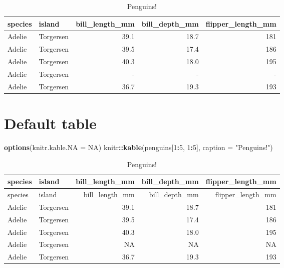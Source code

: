 \documentclass[
]{article}
\newenvironment{Shaded}{\begin{snugshade}}{\end{snugshade}}
\newcommand{\AttributeTok}[1]{\textcolor[rgb]{0.13,0.29,0.53}{#1}}
\newcommand{\ConstantTok}[1]{\textcolor[rgb]{0.56,0.35,0.01}{#1}}
\newcommand{\DecValTok}[1]{\textcolor[rgb]{0.00,0.00,0.81}{#1}}
\newcommand{\FunctionTok}[1]{\textcolor[rgb]{0.13,0.29,0.53}{\textbf{#1}}}
\newcommand{\NormalTok}[1]{#1}
\newcommand{\SpecialCharTok}[1]{\textcolor[rgb]{0.81,0.36,0.00}{\textbf{#1}}}
\newcommand{\StringTok}[1]{\textcolor[rgb]{0.31,0.60,0.02}{#1}}
\begin{document}
\begin{longtable}[t]{llrrr}
\caption{\label{tab:unnamed-chunk-1}Penguins!}\\
\toprule
species & island & bill\_length\_mm & bill\_depth\_mm & flipper\_length\_mm\\
\midrule
Adelie & Torgersen & 39.1 & 18.7 & 181\\
Adelie & Torgersen & 39.5 & 17.4 & 186\\
Adelie & Torgersen & 40.3 & 18.0 & 195\\
Adelie & Torgersen & - & - & -\\
Adelie & Torgersen & 36.7 & 19.3 & 193\\
\bottomrule
\end{longtable}

\section{Default table}\label{default-table}

\begin{Shaded}
\begin{Highlighting}[]
\FunctionTok{options}\NormalTok{(}\AttributeTok{knitr.kable.NA =} \ConstantTok{NA}\NormalTok{)}
\NormalTok{knitr}\SpecialCharTok{::}\FunctionTok{kable}\NormalTok{(penguins[}\DecValTok{1}\SpecialCharTok{:}\DecValTok{5}\NormalTok{, }\DecValTok{1}\SpecialCharTok{:}\DecValTok{5}\NormalTok{], }\AttributeTok{caption =} \StringTok{"Penguins!"}\NormalTok{)}
\end{Highlighting}
\end{Shaded}

\begin{longtable}[]{@{}llrrr@{}}
\caption{Penguins!}\tabularnewline
\toprule\noalign{}
species & island & bill\_length\_mm & bill\_depth\_mm &
flipper\_length\_mm \\
\midrule\noalign{}
\endfirsthead
\toprule\noalign{}
species & island & bill\_length\_mm & bill\_depth\_mm &
flipper\_length\_mm \\
\midrule\noalign{}
\endhead
\bottomrule\noalign{}
\endlastfoot
Adelie & Torgersen & 39.1 & 18.7 & 181 \\
Adelie & Torgersen & 39.5 & 17.4 & 186 \\
Adelie & Torgersen & 40.3 & 18.0 & 195 \\
Adelie & Torgersen & NA & NA & NA \\
Adelie & Torgersen & 36.7 & 19.3 & 193 \\
\end{longtable}
\end{document}

